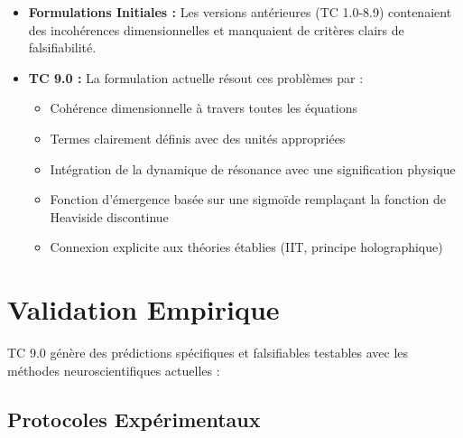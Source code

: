 \documentclass[12pt]{article}
\begin{document}
\begin{itemize}
    \item \textbf{Formulations Initiales :} Les versions antérieures (TC 1.0-8.9) contenaient des incohérences dimensionnelles et manquaient de critères clairs de falsifiabilité.
    
    \item \textbf{TC 9.0 :} La formulation actuelle résout ces problèmes par :
    \begin{itemize}[label=--]
        \item Cohérence dimensionnelle à travers toutes les équations
        \item Termes clairement définis avec des unités appropriées
        \item Intégration de la dynamique de résonance avec une signification physique
        \item Fonction d'émergence basée sur une sigmoïde remplaçant la fonction de Heaviside discontinue
        \item Connexion explicite aux théories établies (IIT, principe holographique)
    \end{itemize}
\end{itemize}

\section{Validation Empirique}
TC 9.0 génère des prédictions spécifiques et falsifiables testables avec les méthodes neuroscientifiques actuelles :

\subsection{Protocoles Expérimentaux}
\end{document}
